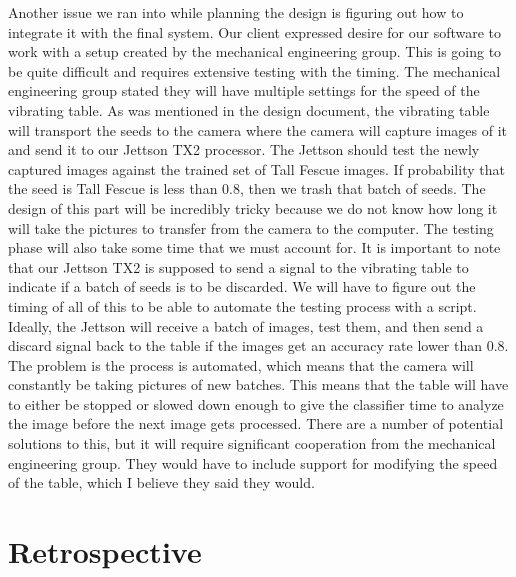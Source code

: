 \documentclass[onecolumn, draftclsnofoot,10pt, compsoc]{IEEEtran}
\begin{document}
	Another issue we ran into while planning the design is figuring out how to integrate it with the final system. Our client expressed desire for our software to work with a setup created by the mechanical engineering group. This is going to be quite difficult and requires extensive testing with the timing. The mechanical engineering group stated they will have multiple settings for the speed of the vibrating table. As was mentioned in the design document, the vibrating table will transport the seeds to the camera where the camera will capture images of it and send it to our Jettson TX2 processor. The Jettson should test the newly captured images against the trained set of Tall Fescue images. If probability that the seed is Tall Fescue is less than 0.8, then we trash that batch of seeds. The design of this part will be incredibly tricky because we do not know how long it will take the pictures to transfer from the camera to the computer. The testing phase will also take some time that we must account for. It is important to note that our Jettson TX2 is supposed to send a signal to the vibrating table to indicate if a batch of seeds is to be discarded. We will have to figure out the timing of all of this to be able to automate the testing process with a script. Ideally, the Jettson will receive a batch of images, test them, and then send a discard signal back to the table if the images get an accuracy rate lower than 0.8. The problem is the process is automated, which means that the camera will constantly be taking pictures of new batches. This means that the table will have to either be stopped or slowed down enough to give the classifier time to analyze the image before the next image gets processed. There are a number of potential solutions to this, but it will require significant cooperation from the mechanical engineering group. They would have to include support for modifying the speed of the table, which I believe they said they would.
	
	\section{Retrospective}
	
\end{document}

